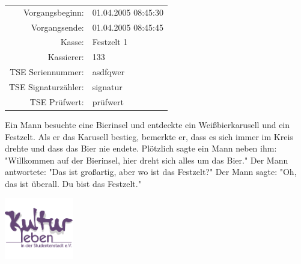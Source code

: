 \documentclass{article}
\begin{document}
    \vspace{1cm}
    \begin{tabularx}{0.8\textwidth}{ RX }
        Vorgangsbeginn:     & 01.04.2005 08:45:30 \\
        Vorgangsende:       & 01.04.2005 08:45:45 \\
        Kasse:              & Festzelt 1          \\
        Kassierer:          & 133                 \\
        TSE Seriennummer:   & asdfqwer            \\
        TSE Signaturzähler: & signatur            \\
        TSE Prüfwert:       & prüfwert            \\
    \end{tabularx}


    \vspace{\fill}
    \begin{center}
        Ein Mann besuchte eine Bierinsel und entdeckte ein Weißbierkarusell und ein Festzelt. Als er das Karusell bestieg, bemerkte er, dass es sich immer im Kreis drehte und dass das Bier nie endete. Plötzlich sagte ein Mann neben ihm: "Willkommen auf der Bierinsel, hier dreht sich alles um das Bier." Der Mann antwortete: "Das ist großartig, aber wo ist das Festzelt?" Der Mann sagte: "Oh, das ist überall. Du bist das Festzelt."

        \includegraphics[width=3cm]{logo}
    \end{center}
\end{document}
